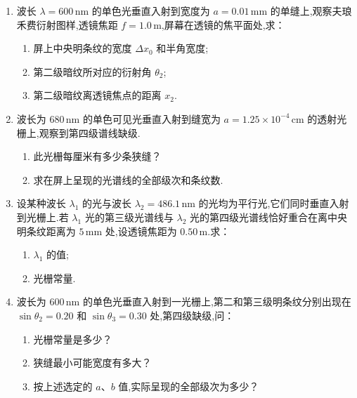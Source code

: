\begin{enumerate}
	
	\vspace{5cm}

	\item[\textbf{11-43}] 波长 $\lambda=600\,\mathrm{nm}$ 的单色光垂直入射到宽度为 $a=0.01\,\mathrm{mm}$ 的单缝上,观察夫琅禾费衍射图样,透镜焦距 $f=1.0\,\mathrm{m}$,屏幕在透镜的焦平面处,求：
	\begin{enumerate}
		\item 屏上中央明条纹的宽度 $\Delta x_0$ 和半角宽度;
		\item 第二级暗纹所对应的衍射角 $\theta_2$;
		\item 第二级暗纹离透镜焦点的距离 $x_2$.
	\end{enumerate}
	
	\vspace{5cm}

	\item[\textbf{11-44}] 波长为 $680\,\mathrm{nm}$ 的单色可见光垂直入射到缝宽为 $a=1.25\times10^{-4}\,\mathrm{cm}$ 的透射光栅上,观察到第四级谱线缺级.
	\begin{enumerate}
		\item 此光栅每厘米有多少条狭缝？
		\item 求在屏上呈现的光谱线的全部级次和条纹数.
	\end{enumerate}
	
	\vspace{5cm}

	\item[\textbf{11-45}] 设某种波长 $\lambda_1$ 的光与波长 $\lambda_2=486.1\,\mathrm{nm}$ 的光均为平行光,它们同时垂直入射到光栅上.若 $\lambda_1$ 光的第三级光谱线与 $\lambda_2$ 光的第四级光谱线恰好重合在离中央明条纹距离为 $5\,\mathrm{mm}$ 处,设透镜焦距为 $0.50\,\mathrm{m}$.求：
	\begin{enumerate}
		\item $\lambda_1$ 的值;
		\item 光栅常量.
	\end{enumerate}
	
	\vspace{12cm}

	\item[\textbf{11-47}] 波长为 $600\,\mathrm{nm}$ 的单色光垂直入射到一光栅上,第二和第三级明条纹分别出现在 $\sin\theta_2=0.20$ 和 $\sin\theta_3=0.30$ 处,第四级缺级,问：
	\begin{enumerate}
		\item 光栅常量是多少？
		\item 狭缝最小可能宽度有多大？
		\item 按上述选定的 $a$、$b$ 值,实际呈现的全部级次为多少？
	\end{enumerate}
	

\end{enumerate}

